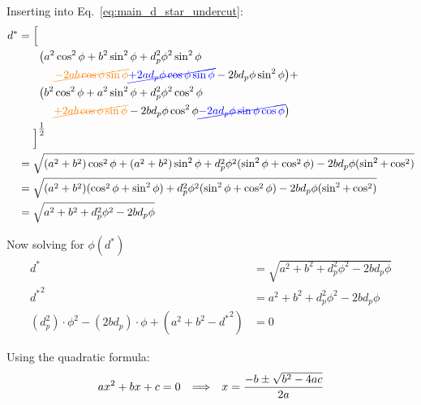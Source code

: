 Inserting into Eq.~\eqref{eq:main_d_star_undercut}:
\begin{subequations}
\begin{align}
    d^* &= \Big[ \nonumber\\
            &\phantom{= [ \;\;} \big( a^2\cos^2\phi + b^2\sin^2\phi + d_p^2\phi^2\sin^2\phi \nonumber\\
            &\phantom{= [ \;\; \big ( a^2}\textcolor{orange}{\cancel{- 2ab\cos\phi\sin\phi}}
                                          \textcolor{blue}{  \cancel{+ 2ad_p\phi\cos\phi\sin\phi}}
                - 2bd_p\phi\sin^2\phi \big) + \\
            &\phantom{= [ \;\; } \big( b^2\cos^2\phi + a^2\sin^2\phi + d_p^2\phi^2\cos^2\phi \nonumber \\
            &\phantom{= [ \;\; \big( b^2} \textcolor{orange}{\cancel{+ 2ab\cos\phi\sin\phi}}
                    - 2bd_p\phi\cos^2\phi \textcolor{blue}{  \cancel{- 2ad_p\phi\sin\phi\cos\phi}} \big) \nonumber \\
            &\phantom{= [ }
        \Big]^{\tfrac{1}{2}} \nonumber \\
        &= \sqrt{(a^2 + b^2)\cos^2\phi + (a^2 + b^2) \sin^2\phi +d_p^2\phi^2(\sin^2\phi + \cos^2\phi) - 2bd_p\phi(\sin^2+\cos^2)}\\
        &= \sqrt{(a^2 + b^2)(\cos^2\phi + \sin^2\phi) +d_p^2\phi^2(\sin^2\phi + \cos^2\phi) - 2bd_p\phi(\sin^2+\cos^2)}\\
        &= \sqrt{ a^2 + b^2 + d_p^2\phi^2 - 2bd_p\phi}
\end{align}
\end{subequations}

Now solving for $\phi(d^*)$
\begin{subequations}
\begin{align}
    d^*         &= \sqrt{a^2 + b^2 +d_p^2\phi^2 - 2bd_p\phi}\\
    {d^*}^2     &= a^2 + b^2 +d_p^2\phi^2 - 2bd_p\phi\\
    (d_p^2)\cdot\phi^2 - (2bd_p)\cdot\phi + (a^2 + b^2 - {d^*}^2)   &= 0
\end{align}
\end{subequations}

Using the quadratic formula:
\begin{equation*}
    ax^2+bx + c = 0 \qq{$\Longrightarrow$} x = \frac{-b \pm \sqrt{b^2 -4ac}}{2a}
\end{equation*}

